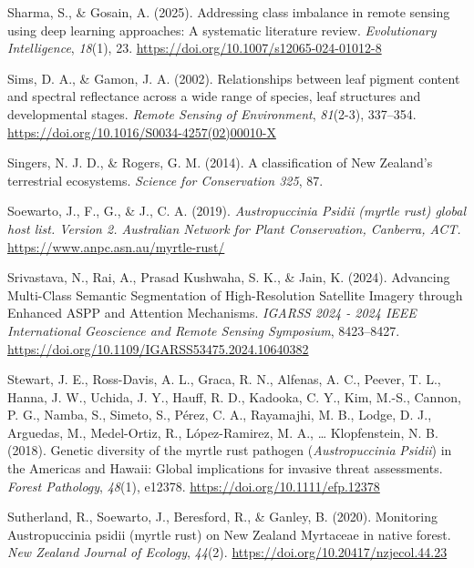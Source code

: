 \documentclass[
]{scrreprt}
\newlength{\cslhangindent}
\newenvironment{CSLReferences}[2] %
 {\begin{list}{}{%
  \setlength{\itemindent}{0pt}
  \setlength{\leftmargin}{0pt}
  \setlength{\parsep}{0pt}
  \setlength{\baselineskip}{12pt}
  \ifodd #1
   \setlength{\leftmargin}{\cslhangindent}
   \setlength{\itemindent}{-1\cslhangindent}
  \fi
  \setlength{\itemsep}{4pt}}}
 {\end{list}}
\begin{document}
\begin{CSLReferences}{1}{0}
Sharma, S., \& Gosain, A. (2025). Addressing class imbalance in remote
sensing using deep learning approaches: A systematic literature review.
\emph{Evolutionary Intelligence}, \emph{18}(1), 23.
\url{https://doi.org/10.1007/s12065-024-01012-8}

Sims, D. A., \& Gamon, J. A. (2002). Relationships between leaf pigment
content and spectral reflectance across a wide range of species, leaf
structures and developmental stages. \emph{Remote Sensing of
Environment}, \emph{81}(2-3), 337--354.
\url{https://doi.org/10.1016/S0034-4257(02)00010-X}

Singers, N. J. D., \& Rogers, G. M. (2014). A classification of {New
Zealand}'s terrestrial ecosystems. \emph{Science for Conservation 325},
87.

Soewarto, J., F., G., \& J., C. A. (2019). \emph{{\emph{Austropuccinia
Psidii}} (myrtle rust) global host list. {Version} 2. {Australian
Network} for {Plant Conservation}, {Canberra}, {ACT}.}
\url{https://www.anpc.asn.au/myrtle-rust/}

Srivastava, N., Rai, A., Prasad Kushwaha, S. K., \& Jain, K. (2024).
Advancing {Multi-Class Semantic Segmentation} of {High-Resolution
Satellite Imagery} through {Enhanced ASPP} and {Attention Mechanisms}.
\emph{{IGARSS} 2024 - 2024 {IEEE International Geoscience} and {Remote
Sensing Symposium}}, 8423--8427.
\url{https://doi.org/10.1109/IGARSS53475.2024.10640382}

Stewart, J. E., Ross-Davis, A. L., Graca, R. N., Alfenas, A. C., Peever,
T. L., Hanna, J. W., Uchida, J. Y., Hauff, R. D., Kadooka, C. Y., Kim,
M.-S., Cannon, P. G., Namba, S., Simeto, S., Pérez, C. A., Rayamajhi, M.
B., Lodge, D. J., Arguedas, M., Medel-Ortiz, R., López-Ramirez, M. A.,
\ldots{} Klopfenstein, N. B. (2018). Genetic diversity of the myrtle
rust pathogen ({\emph{Austropuccinia}}{ \emph{Psidii}}) in the
{Americas} and {Hawaii}: {Global} implications for invasive threat
assessments. \emph{Forest Pathology}, \emph{48}(1), e12378.
\url{https://doi.org/10.1111/efp.12378}

Sutherland, R., Soewarto, J., Beresford, R., \& Ganley, B. (2020).
Monitoring {Austropuccinia} psidii (myrtle rust) on {New Zealand
Myrtaceae} in native forest. \emph{New Zealand Journal of Ecology},
\emph{44}(2). \url{https://doi.org/10.20417/nzjecol.44.23}


\end{CSLReferences}
\end{document}
